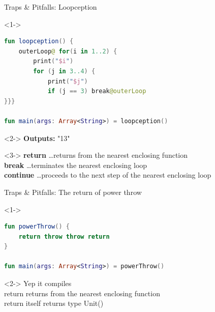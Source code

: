 \begin{frame}[fragile]{Traps \& Pitfalls: Loopception}
	\begin{overlayarea}{\textwidth}{\textheight}
		\begin{onlyenv}<1->
			\begin{lstlisting}[language=Kotlin]
fun loopception() {
	outerLoop@ for(i in 1..2) {
		print("$i")
		for (j in 3..4) {
			print("$j")
			if (j == 3) break@outerLoop
}}}

fun main(args: Array<String>) = loopception()
			\end{lstlisting}
		\end{onlyenv}
		\begin{onlyenv}<2->
			\textbf{Outputs:} "13"\\\vspace{\baselineskip}
		\end{onlyenv}
		\begin{onlyenv}<3->
			\textbf{return} \dots returns from the nearest enclosing function\\
			\textbf{break} \dots terminates the nearest enclosing loop\\
			\textbf{continue} \dots proceeds to the next step of the nearest enclosing loop
		\end{onlyenv}
	\end{overlayarea}
\end{frame}


\begin{frame}[fragile]{Traps \& Pitfalls: The return of power throw}
	\begin{overlayarea}{\textwidth}{.5\textheight}
		\begin{onlyenv}<1->
			\begin{lstlisting}[language=Kotlin]
fun powerThrow() {
	return throw throw return
}

fun main(args: Array<String>) = powerThrow()
			\end{lstlisting}
		\end{onlyenv}
		\begin{onlyenv}<2->
			Yep it compiles\\
			return returns from the nearest enclosing function\\
			return itself returns type Unit()
		\end{onlyenv}
	\end{overlayarea}
\end{frame}

